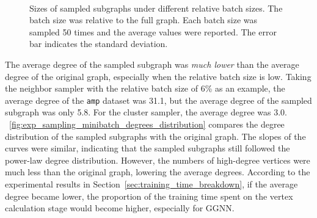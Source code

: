 \begin{figure}[H]
    \centering
     \\
    \caption{Sizes of sampled subgraphs under different relative batch sizes. The batch size was relative to the full graph. Each batch size was sampled 50 times and the average values were reported. The error bar indicates the standard deviation.}
    \label{fig:exp_sampling_minibatch_graph_info}
\end{figure}

The average degree of the sampled subgraph was \emph{much lower} than the average degree of the original graph, especially when the relative batch size is low.
%
Taking the neighbor sampler with the relative batch size of 6\% as an example, the average degree of the \texttt{amp} dataset was 31.1, but the average degree of the sampled subgraph was only 5.8.
%
For the cluster sampler, the average degree was 3.0.
%
\figurename~\ref{fig:exp_sampling_minibatch_degrees_distribution} compares the degree distribution of the sampled subgraphs with the original graph.
%
The slopes of the curves were similar, indicating that the sampled subgraphs still followed the power-law degree distribution.
%
However, the numbers of high-degree vertices were much less than the original graph, lowering the average degrees.
%
According to the experimental results in Section~\ref{sec:training_time_breakdown}, if the average degree became lower, the proportion of the training time spent on the vertex calculation stage would become higher, especially for GGNN.

